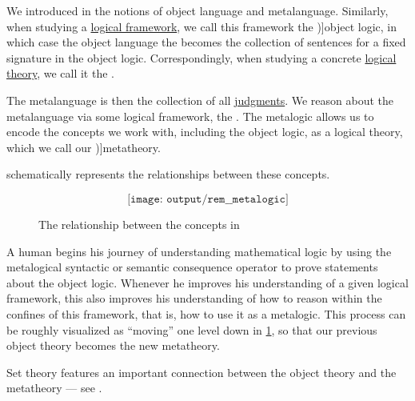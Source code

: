 \begin{concept}\label{con:metalogic}
  We introduced in  the notions of object language and metalanguage. Similarly, when studying a \hyperref[def:logical_framework]{logical framework}, we call this framework the \term[en=object logic (\cite[3]{Kleene2002Logic})]{object logic}, in which case the object language the becomes the collection of sentences for a fixed signature in the object logic. Correspondingly, when studying a concrete \hyperref[def:logical_theory]{logical theory}, we call it the .

  The metalanguage is then the collection of all \hyperref[con:judgment]{judgments}. We reason about the metalanguage via some logical framework, the . The metalogic allows us to encode the concepts we work with, including the object logic, as a logical theory, which we call our \term[en=metatheory (\cite[199]{Kleene2002Logic})]{metatheory}.

   schematically represents the relationships between these concepts.

  \begin{figure}[!ht]
    \begin{equation*}
      \texttt{[image: output/rem\_\_metalogic]}
    \end{equation*}
    \caption{The relationship between the concepts in }\label{fig:con:metalogic}
  \end{figure}

  A human begins his journey of understanding mathematical logic by using the metalogical syntactic or semantic consequence operator to prove statements about the object logic. Whenever he improves his understanding of a given logical framework, this also improves his understanding of how to reason within the confines of this framework, that is, how to use it as a metalogic. This process can be roughly visualized as \enquote{moving} one level down in \cref{fig:con:metalogic}, so that our previous object theory becomes the new metatheory.
\end{concept}
\begin{comments}
  \item Set theory features an important connection between the object theory and the metatheory --- see .
\end{comments}

